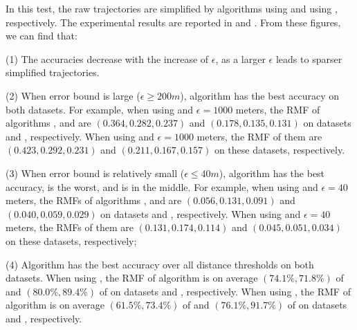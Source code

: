 

In this test, the raw trajectories are simplified by algorithms \siped using \ped and \cised using \sed, respectively.
The experimental results are reported in  and .
From these figures, we can find that:

\ni (1) The accuracies decrease with the increase of $\epsilon$, as a larger $\epsilon$ leads to sparser simplified trajectories. %

\ni (2) When error bound is large ($\epsilon \ge 200m$), algorithm \stmm has the best accuracy on both datasets.
For example, when using \sed and $\epsilon=1000$ meters, the RMF of algorithms \hmmbased, \gfbased and \stmm are {$(0.364, 0.282, 0.237)$} and
 {$(0.178, 0.135, 0.131)$} on datasets \sercar and \pubdata, respectively.
When using \ped and $\epsilon=1000$ meters, the RMF of them are {$(0.423, 0.292, 0.231)$} and
 {$(0.211, 0.167, 0.157)$} on these datasets, respectively.

\ni (3) When error bound is relatively small ($\epsilon \le 40m$), algorithm \hmmbased has the best
accuracy, \gfbased is the worst, and \stmm is in the middle.
For example, when using \sed and $\epsilon=40$ meters, the RMFs of algorithms \hmmbased, \gfbased and \stmm are {$(0.056, 0.131, 0.091)$} and
{$(0.040, 0.059, 0.029)$} on datasets \sercar and \pubdata, respectively. When using \ped and $\epsilon=40$ meters, the RMFs of them are {$(0.131, 0.174, 0.114)$} and
{$(0.045, 0.051, 0.034)$} on these datasets, respectively;

\ni (4) Algorithm \stmm has the best accuracy over all distance thresholds on both datasets.
When using \sed, the RMF of algorithm  \stmm is on average ${(74.1\%, 71.8\%)}$ of \hmmbased and ${(80.0\%, 89.4\%)}$ of \gfbased on datasets \sercar and \pubdata, respectively.
When using \ped, the RMF of algorithm  \stmm is on average ${(61.5\%, 73.4\%)}$
of \hmmbased and ${(76.1\%, 91.7\%)}$ of \gfbased on datasets \sercar and \pubdata, respectively.




